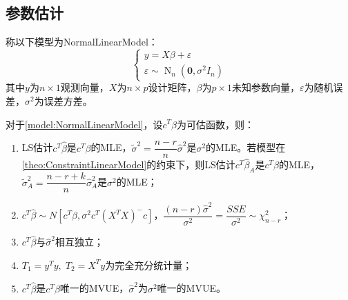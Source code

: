 \subsection{参数估计}
\begin{definition}\label{model:NormalLinearModel}
	称以下模型为\gls{NormalLinearModel}：
	\begin{equation*}
		\begin{cases}
			y=X\beta+\varepsilon \\
			\varepsilon\sim\operatorname{N}_n(\mathbf{0},\sigma^2I_n)
		\end{cases}
	\end{equation*}
	其中$y$为$n\times 1$观测向量，$X$为$n\times p$设计矩阵，$\beta$为$p\times 1$未知参数向量，$\varepsilon$为随机误差，$\sigma^2$为误差方差。
\end{definition}
\begin{property}\label{prop:NormalLinearModel}
	对于\cref{model:NormalLinearModel}，设$c^T\beta$为可估函数，则：
	\begin{enumerate}
		\item LS估计$c^T\hat{\beta}$是$c^T\beta$的MLE，$\tilde{\sigma}^2=\dfrac{n-r}{n}\hat{\sigma}^2$是$\sigma^2$的MLE。若模型在\cref{theo:ConstraintLinearModel}的约束下，则LS估计$c^T\hat{\beta}_A$是$c^T\beta$的MLE，$\tilde{\sigma}_A^2=\dfrac{n-r+k}{n}\hat{\sigma}_A^2$是$\sigma^2$的MLE；
		\item $c^T\hat{\beta}\sim N[c^T\beta,\sigma^2c^T(X^TX)^-c]$，$\dfrac{(n-r)\hat{\sigma}^2}{\sigma^2}=\dfrac{SSE}{\sigma^2}\sim\chi_{n-r}^2$；
		\item $c^T\hat{\beta}$与$\hat{\sigma}^2$相互独立；
		\item $T_1=y^Ty,\;T_2=X^Ty$为完全充分统计量；
		\item $c^T\hat{\beta}$是$c^T\beta$唯一的MVUE，$\hat{\sigma}^2$为$\sigma^2$唯一的MVUE。
	\end{enumerate}
\end{property}

